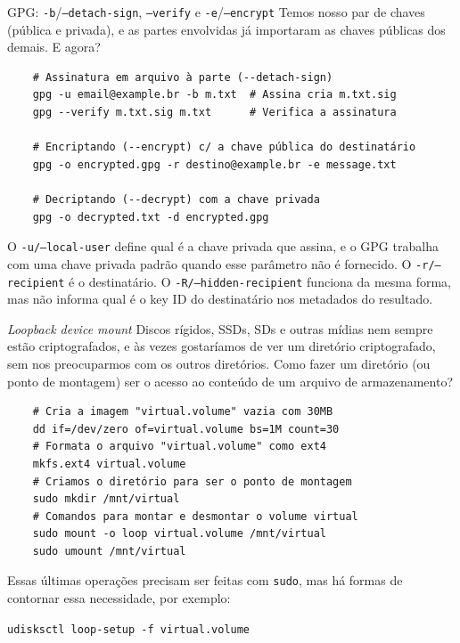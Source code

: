 \documentclass[utf8]{beamer}
\begin{document}
\begin{frame}[fragile]{GPG: \texttt{-b}/\texttt{--detach-sign},
                            \texttt{--verify} e
                            \texttt{-e}/\texttt{--encrypt}}
  Temos nosso par de chaves (pública e privada),
  e as partes envolvidas já importaram as chaves públicas
  dos demais. E agora?
  \vfill
  \begin{verbatim}
    # Assinatura em arquivo à parte (--detach-sign)
    gpg -u email@example.br -b m.txt  # Assina cria m.txt.sig
    gpg --verify m.txt.sig m.txt      # Verifica a assinatura

    # Encriptando (--encrypt) c/ a chave pública do destinatário
    gpg -o encrypted.gpg -r destino@example.br -e message.txt

    # Decriptando (--decrypt) com a chave privada
    gpg -o decrypted.txt -d encrypted.gpg
  \end{verbatim}
  \vfill
  O \texttt{-u/--local-user}
  define qual é a chave privada que assina,
  e o GPG trabalha com uma chave privada padrão
  quando esse parâmetro não é fornecido.
  \vfill
  O \texttt{-r/--recipient} é o destinatário.
  O \texttt{-R/--hidden-recipient} funciona da mesma forma,
  mas não informa qual é o key ID do destinatário
  nos metadados do resultado.
\end{frame}


\begin{frame}[fragile]{\emph{Loopback device mount}}
  Discos rígidos, SSDs, SDs e outras mídias
  nem sempre estão criptografados,
  e às vezes gostaríamos de ver um diretório criptografado,
  sem nos preocuparmos com os outros diretórios.
  \vfill
  Como fazer um diretório (ou ponto de montagem)
  ser o acesso ao conteúdo de um arquivo de armazenamento?
  \vfill
  \begin{verbatim}
    # Cria a imagem "virtual.volume" vazia com 30MB
    dd if=/dev/zero of=virtual.volume bs=1M count=30
    # Formata o arquivo "virtual.volume" como ext4
    mkfs.ext4 virtual.volume
    # Criamos o diretório para ser o ponto de montagem
    sudo mkdir /mnt/virtual
    # Comandos para montar e desmontar o volume virtual
    sudo mount -o loop virtual.volume /mnt/virtual
    sudo umount /mnt/virtual
  \end{verbatim}
  \vfill
  Essas últimas operações precisam ser feitas com \texttt{sudo},
  mas há formas de contornar essa necessidade,
  por exemplo:
  \vfill
  \begin{center}
    \texttt{udisksctl loop-setup -f virtual.volume}
  \end{center}
\end{frame}
\end{document}
